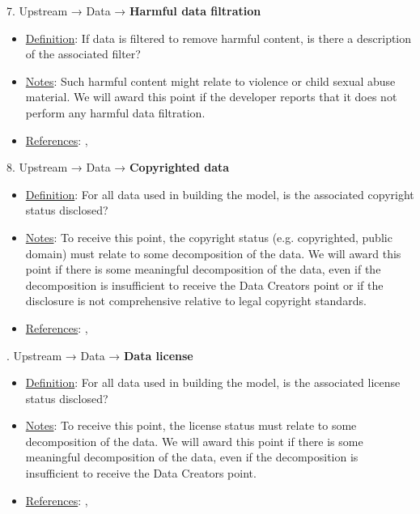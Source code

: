 7. Upstream → Data → \textbf{Harmful data filtration}
\vspace{-\parskip}
\begin{itemize}
	\item
	\underline{Definition}: If data is filtered to remove harmful content, is there a description of the associated filter?
	\item
	\underline{Notes}: Such harmful content might relate to violence or child sexual abuse material. We will award this point if the developer reports that it does not perform any harmful data filtration.
	\item
	\underline{References}: \citet{dodge2021c4}, \citet{longpre2023pretrainer}
\end{itemize} \vspace{\baselineskip}


8. Upstream → Data → \textbf{Copyrighted data}
\vspace{-\parskip}
\begin{itemize}
	\item
	\underline{Definition}: For all data used in building the model, is the associated copyright status disclosed?
	\item
	\underline{Notes}: To receive this point, the copyright status (e.g. copyrighted, public domain) must relate to some decomposition of the data. We will award this point if there is some meaningful decomposition of the data, even if the decomposition is insufficient to receive the Data Creators point or if the disclosure is not comprehensive relative to legal copyright standards.
	\item
	\underline{References}: \citet{bandy2021addressing}, \citet{genlaw2023}
\end{itemize} \vspace{\baselineskip}


. Upstream → Data → \textbf{Data license}
\vspace{-\parskip}
\begin{itemize}
	\item
	\underline{Definition}: For all data used in building the model, is the associated license status disclosed?
	\item
	\underline{Notes}: To receive this point, the license status must relate to some decomposition of the data. We will award this point if there is some meaningful decomposition of the data, even if the decomposition is insufficient to receive the Data Creators point.
	\item
	\underline{References}: \citet{bandy2021addressing}, \citet{genlaw2023}
\end{itemize} \vspace{\baselineskip}


